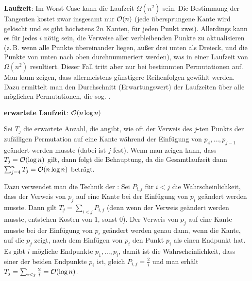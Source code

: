 \linie

\textbf{Laufzeit}:
Im Worst-Case kann die Laufzeit $\Omega(n^2)$ sein.
Die Bestimmung der Tangenten kostet zwar insgesamt nur $\mathcal{O}(n)$
(jede übersprungene Kante wird gelöscht und es gibt höchstens $2n$ Kanten, für jeden
Punkt zwei).
Allerdings kann es für jedes $i$ nötig sein, die Verweise aller verbleibenden Punkte
zu aktualisieren
(z.\,B. wenn alle Punkte übereinander liegen, außer drei unten als Dreieck, und die
Punkte von unten nach oben durchnummeriert werden),
was in einer Laufzeit von $\Omega(n^2)$ resultiert.
Dieser Fall tritt aber nur bei bestimmten Permutationen auf.
Man kann zeigen, dass allermeistens günstigere Reihenfolgen gewählt werden.
Dazu ermittelt man den Durchschnitt (Erwartungswert) der Laufzeiten über alle möglichen
Permutationen, die sog. .

\textbf{erwartete Laufzeit}:
$\mathcal{O}(n \log n)$

\begin{Beweis}
    Sei $T_j$ die erwartete Anzahl, die angibt, wie oft der Verweis des $j$-ten Punkts
    der zufälligen Permutation auf eine Kante während der Einfügung von $p_4, \dotsc, p_{j-1}$
    geändert werden musste (dabei ist $j$ fest).
    Wenn man zeigen kann, dass $T_j = \mathcal{O}(\log n)$ gilt, dann folgt die Behauptung,
    da die Gesamtlaufzeit dann $\sum_{j=4}^n T_j = \mathcal{O}(n \log n)$ beträgt.
    
    Dazu verwendet man die Technik der :
    Sei $P_{i,j}$ für $i < j$ die Wahrscheinlichkeit, dass der Verweis von $p_j$ auf eine Kante
    bei der Einfügung von $p_i$ geändert werden musste.
    Dann gilt $T_j = \sum_{i < j} P_{i,j}$
    (denn wenn der Verweis geändert werden musste, entstehen Kosten von $1$, sonst $0$).
    Der Verweis von $p_j$ auf eine Kante
    musste bei der Einfügung von $p_i$ geändert werden genau dann,
    wenn die Kante, auf die $p_j$ zeigt, nach dem Einfügen von $p_i$ den Punkt $p_i$ als einen
    Endpunkt hat.
    Es gibt $i$ mögliche Endpunkte $p_1, \dotsc, p_i$, damit ist die Wahrscheinlichkeit,
    dass einer der beiden Endpunkte $p_i$ ist, gleich $P_{i,j} = \frac{2}{i}$
    und man erhält $T_j = \sum_{i < j} \frac{2}{i} = \mathcal{O}(\log n)$.
\end{Beweis}

\pagebreak
